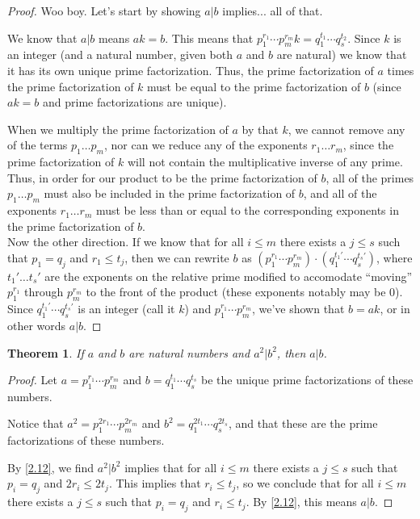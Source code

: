 \documentclass{article}
\newtheorem{thm}{Theorem}[section]
\numberwithin{equation}{thm}
\begin{document}
\begin{proof}
  Woo boy. Let's start by showing $a | b$ implies... all of that.

  We know that $a | b$ means $ak = b$. This means that $p_1^{r_1} \cdots p_m^{r_m} k = q_1^{t_1} \cdots q_s^{t_2}$. Since $k$ is an integer (and a natural number, given both $a$ and $b$ are natural) we know that it has its own unique prime factorization. Thus, the prime factorization of $a$ times the prime factorization of $k$ must be equal to the prime factorization of $b$ (since $ak = b$ and prime factorizations are unique).

  When we multiply the prime factorization of $a$ by that $k$, we cannot remove any of the terms $p_1 \ldots p_m$, nor can we reduce any of the exponents $r_1 \ldots r_m$, since the prime factorization of $k$ will not contain the multiplicative inverse of any prime. Thus, in order for our product to be the prime factorization of $b$, all of the primes $p_1 \ldots p_m$ must also be included in the prime factorization of $b$, and all of the exponents $r_1 \ldots r_m$ must be less than or equal to the corresponding exponents in the prime factorization of $b$. \\[0ex]

  Now the other direction. If we know that for all $i \leq m$ there exists a $j \leq s$ such that $p_1 = q_j$ and $r_1 \leq t_j$, then we can rewrite $b$ as $(p_1^{r_1} \cdots p_m^{r_m}) \cdot (q_1^{t_1'} \cdots q_s^{t_s'})$, where $t_1' \ldots t_s'$ are the exponents on the relative prime modified to accomodate ``moving'' $p_1^{r_1}$ through $p_m^{r_m}$ to the front of the product (these exponents notably may be $0$).
  Since $q_1^{t_1'} \cdots q_s^{t_s'}$ is an integer (call it $k$) and $p_1^{r_1} \cdots p_m^{r_m}$, we've shown that $b = ak$, or in other words $a | b$.
\end{proof}



\begin{thm} \label{2.13}
  If $a$ and $b$ are natural numbers and $a^2 | b^2$, then $a | b$.
\end{thm}

\begin{proof}
  Let $a = p_1^{r_1} \cdots p_m^{r_m}$ and $b = q_1^{t_1} \cdots q_s^{t_s}$ be the unique prime factorizations of these numbers.

  Notice that $a^2 = p_1^{2r_1} \cdots p_m^{2r_m}$ and $b^2 = q_1^{2t_1} \cdots q_s^{2t_s}$, and that these are the prime factorizations of these numbers.

  By \ref{2.12}, we find $a^2 | b^2$ implies that for all $i \leq m$ there exists a $j \leq s$ such that $p_i = q_j$ and $2r_i \leq 2t_j$. This implies that $r_i \leq t_j$, so we conclude that for all $i \leq m$ there exists a $j \leq s$ such that $p_i = q_j$ and $r_i \leq t_j$. By \ref{2.12}, this means $a | b$.
\end{proof}
\end{document}

